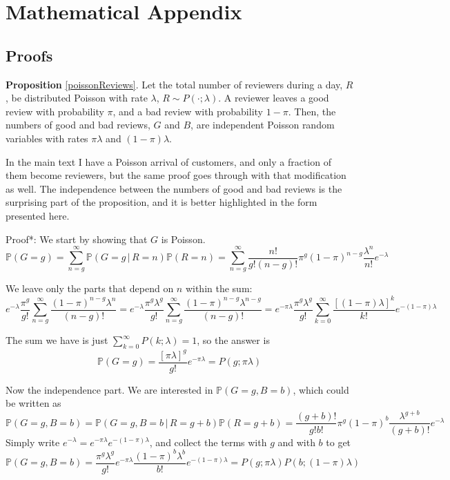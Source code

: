 \documentclass[12pt,pagebackref]{article}
\newcommand{\PP}[1]{\mathbb{P}\left(#1\right)}
\newcommand{\CP}[2]{\mathbb{P}\left(#1 \,| \, #2 \right)}
\begin{document}
\newpage

\hypertarget{mathematical-appendix}{%
\section{Mathematical Appendix}\label{mathematical-appendix}}

\hypertarget{proofs}{%
\subsection{Proofs}\label{proofs}}

\textbf{Proposition} \ref{poissonReviews}. Let the total number of
reviewers during a day, \(R\), be distributed Poisson with rate
\(\lambda\), \(R\sim P(\cdot; \lambda)\). A reviewer leaves a good
review with probability \(\pi\), and a bad review with probability
\(1-\pi\). Then, the numbers of good and bad reviews, \(G\) and \(B\),
are independent Poisson random variables with rates \(\pi\lambda\) and
\((1-\pi)\lambda\).

In the main text I have a Poisson arrival of customers, and only a
fraction of them become reviewers, but the same proof goes through with
that modification as well. The independence between the numbers of good
and bad reviews is the surprising part of the proposition, and it is
better highlighted in the form presented here.

\vspace{1em}

\noindent *Proof*: We start by showing that \(G\) is Poisson. \[
\PP{G=g} = \sum_{n=g}^{\infty}\CP{G = g}{R=n}\PP{R = n} 
=
\sum_{n = g}^{\infty}
\frac{n!}{g!(n-g)!}
\pi^g (1-\pi)^{n-g}
\frac{\lambda^n}{n!} e^{-\lambda}
\]

\noindent We leave only the parts that depend on \(n\) within the sum:
\[
e^{-\lambda}\frac{\pi^g}{g!}\sum_{n = g}^{\infty}
\frac{(1-\pi)^{n-g} \lambda^n}{(n-g)!}
=
e^{-\lambda}\frac{\pi^g\lambda^g}{g!}\sum_{n = g}^{\infty}
\frac{(1-\pi)^{n-g} \lambda^{n-g} }{(n-g)!}
=
e^{-\pi\lambda}\frac{\pi^g\lambda^g}{g!}\sum_{k=0}^{\infty}
\frac{[(1-\pi)\lambda]^{k} }{k!}e^{-(1-\pi)\lambda}
\]

\noindent The sum we have is just
\(\sum_{k=0}^{\infty} P(k; \lambda) = 1\), so the answer is \[
\PP{G=g} = \frac{[\pi\lambda]^g}{g!}e^{-\pi\lambda} = P(g; \pi\lambda)
\]

Now the independence part. We are interested in \(\PP{G=g, B=b}\), which
could be written as \[\PP{G=g, B=b} = \CP{G=g, B=b}{R=g+b}\PP{R=g+b} = 
\frac{(g+b)!}{g!b!}
\pi^g (1-\pi)^b
\frac{\lambda^{g+b}}{(g+b)!} e^{-\lambda}
\] Simply write \(e^{-\lambda} = e^{-\pi\lambda}e^{-(1-\pi)\lambda}\),
and collect the terms with \(g\) and with \(b\) to get \[
\PP{G=g, B=b} = 
\frac{\pi^g \lambda^g}{g!}e^{-\pi\lambda}
\frac{(1-\pi)^b\lambda^b}{b!}e^{-(1-\pi)\lambda}
=
P(g; \pi \lambda) P(b; (1-\pi)\lambda)\]
\end{document}
